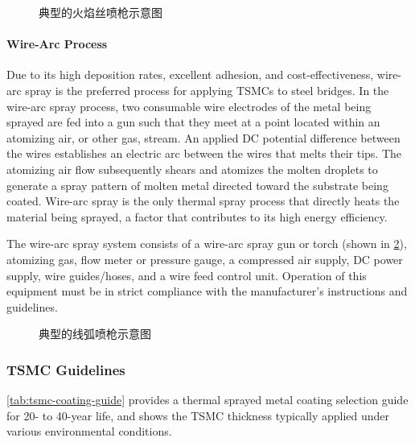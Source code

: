 \begin{figure}
  \caption{典型的火焰丝喷枪示意图}
  \label{fig:flame-wire-spray-gun}
\end{figure}


\paragraph*{Wire-Arc Process}
Due to its high deposition rates, excellent adhesion, and cost-effectiveness, wire-arc spray is the preferred
process for applying TSMCs to steel bridges. In the wire-arc spray process, two consumable wire electrodes of the
metal being sprayed are fed into a gun such that they meet at a point located within an atomizing air, or other gas,
stream. An applied DC potential difference between the wires establishes an electric arc between the wires that melts their tips. The atomizing air flow subsequently shears and atomizes the molten droplets to generate a spray pattern of
molten metal directed toward the substrate being coated. Wire-arc spray is the only thermal spray process that
directly heats the material being sprayed, a factor that contributes to its high energy efficiency.

The wire-arc spray system consists of a wire-arc spray gun or torch (shown in \cref{fig:wire-arc-spray-gun}), atomizing gas, flow
meter or pressure gauge, a compressed air supply, DC power supply, wire guides/hoses, and a wire feed control unit.
Operation of this equipment must be in strict compliance with the manufacturer’s instructions and guidelines.

\begin{figure}
  \caption{典型的线弧喷枪示意图}
  \label{fig:wire-arc-spray-gun}
\end{figure}

\subsubsection{TSMC Guidelines}
\cref{tab:tsmc-coating-guide} provides a thermal sprayed metal coating selection guide for 20- to 40-year life, and shows the TSMC
thickness typically applied under various environmental conditions.

